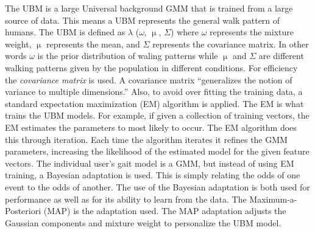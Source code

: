\documentclass{sig-alternate}
\begin{document}
	 The UBM is a large Universal background GMM that is trained from a large source of data. This means a UBM represents the general walk pattern of humans. The UBM is defined as 
\begin{math} \lambda \end{math} (\begin{math} \omega \end{math},
\begin{math} \upmu \end{math},
\begin{math} \Sigma \end{math}) where
\begin{math} \omega \end{math} represents the mixture weight, \begin{math} \upmu \end{math} represents the mean, and \begin{math} \Sigma \end{math} represents the covariance matrix. In other words \begin{math} \omega \end{math} is the prior distribution of waling patterns while \begin{math} \upmu \end{math} and \begin{math} \Sigma \end{math} are different walking patterns given by the population in different conditions. For efficiency the \textit{covariance matrix} is used. A covariance matrix ``generalizes the notion of variance to multiple dimensions.'' Also, to avoid over fitting the training data, a standard expectation maximization (EM) algorithm is applied. The EM is what trains the UBM models. For example, if given a collection of training vectors, the EM estimates the parameters to most likely to occur. The EM algorithm does this through iteration. Each time the algorithm iterates it refines the GMM parameters, increasing the likelihood of the estimated model for the given feature vectors. 
	The individual user's gait model is a GMM, but instead of using EM training, a Bayesian adaptation is used. This is simply relating the odds of one event to the odds of another. The use of the Bayesian adaptation is both used for performance as well as for its ability to learn from the data. The Maximum-a-Posteriori (MAP) is the adaptation used. The MAP adaptation adjusts the Gaussian components and mixture weight to personalize the UBM model. 
\end{document}
